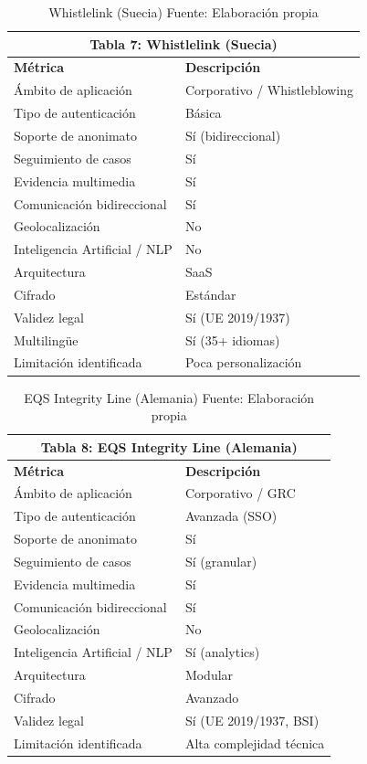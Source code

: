 \begin{table}[htbp]
\centering
\small
\begin{tabular}{|l|l|}
\hline \multicolumn{2}{|c|}{\textbf{Tabla 7: Whistlelink (Suecia)}} \\
\hline \textbf{Métrica} & \textbf{Descripción} \\
\hline Ámbito de aplicación & Corporativo / Whistleblowing \\
\hline Tipo de autenticación & Básica \\
\hline Soporte de anonimato & Sí (bidireccional) \\
\hline Seguimiento de casos & Sí \\
\hline Evidencia multimedia & Sí \\
\hline Comunicación bidireccional & Sí \\
\hline Geolocalización & No \\
\hline Inteligencia Artificial / NLP & No \\
\hline Arquitectura & SaaS \\
\hline Cifrado & Estándar \\
\hline Validez legal & Sí (UE 2019/1937) \\
\hline Multilingüe & Sí (35+ idiomas) \\
\hline Limitación identificada & Poca personalización \\
\hline \end{tabular}
\caption{Whistlelink (Suecia) \label{tab:whistlelink} \footnotesize Fuente: Elaboración propia \cite{15}} 
\end{table}



\begin{table}[htbp]
\centering
\small
\begin{tabular}{|l|l|}
\hline \multicolumn{2}{|c|}{\textbf{Tabla 8: EQS Integrity Line (Alemania)}} \\
\hline \textbf{Métrica} & \textbf{Descripción} \\
\hline Ámbito de aplicación & Corporativo / GRC \\
\hline Tipo de autenticación & Avanzada (SSO) \\
\hline Soporte de anonimato & Sí \\
\hline Seguimiento de casos & Sí (granular) \\
\hline Evidencia multimedia & Sí \\
\hline Comunicación bidireccional & Sí \\
\hline Geolocalización & No \\
\hline Inteligencia Artificial / NLP & Sí (analytics) \\
\hline Arquitectura & Modular \\
\hline Cifrado & Avanzado \\
\hline Validez legal & Sí (UE 2019/1937, BSI) \\
\hline Limitación identificada & Alta complejidad técnica \\
\hline \end{tabular}
\caption{EQS Integrity Line (Alemania) \label{tab:eqs} \footnotesize Fuente: Elaboración propia \cite{16}} 
\end{table}


